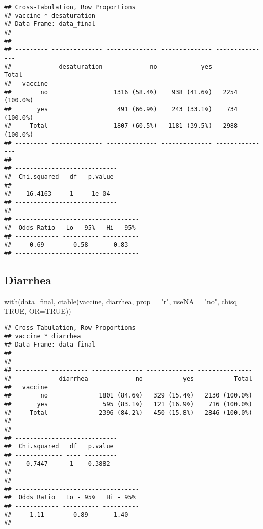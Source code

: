 \documentclass[
]{article}
\newenvironment{Shaded}{\begin{snugshade}}{\end{snugshade}}
\newcommand{\AttributeTok}[1]{\textcolor[rgb]{0.77,0.63,0.00}{#1}}
\newcommand{\ConstantTok}[1]{\textcolor[rgb]{0.00,0.00,0.00}{#1}}
\newcommand{\FunctionTok}[1]{\textcolor[rgb]{0.00,0.00,0.00}{#1}}
\newcommand{\NormalTok}[1]{#1}
\newcommand{\StringTok}[1]{\textcolor[rgb]{0.31,0.60,0.02}{#1}}
\begin{document}
\begin{verbatim}
## Cross-Tabulation, Row Proportions  
## vaccine * desaturation  
## Data Frame: data_final  
## 
## 
## --------- -------------- -------------- -------------- ---------------
##             desaturation             no            yes           Total
##   vaccine                                                             
##        no                  1316 (58.4%)    938 (41.6%)   2254 (100.0%)
##       yes                   491 (66.9%)    243 (33.1%)    734 (100.0%)
##     Total                  1807 (60.5%)   1181 (39.5%)   2988 (100.0%)
## --------- -------------- -------------- -------------- ---------------
## 
## ----------------------------
##  Chi.squared   df   p.value 
## ------------- ---- ---------
##    16.4163     1     1e-04  
## ----------------------------
## 
## ----------------------------------
##  Odds Ratio   Lo - 95%   Hi - 95% 
## ------------ ---------- ----------
##     0.69        0.58       0.83   
## ----------------------------------
\end{verbatim}

\hypertarget{diarrhea}{%
\subsection{Diarrhea}\label{diarrhea}}

\begin{Shaded}
\begin{Highlighting}[]
\FunctionTok{with}\NormalTok{(data\_final, }\FunctionTok{ctable}\NormalTok{(vaccine, diarrhea, }\AttributeTok{prop =} \StringTok{"r"}\NormalTok{, }\AttributeTok{useNA =} \StringTok{"no"}\NormalTok{, }\AttributeTok{chisq =} \ConstantTok{TRUE}\NormalTok{, }\AttributeTok{OR=}\ConstantTok{TRUE}\NormalTok{))}
\end{Highlighting}
\end{Shaded}

\begin{verbatim}
## Cross-Tabulation, Row Proportions  
## vaccine * diarrhea  
## Data Frame: data_final  
## 
## 
## --------- ---------- -------------- ------------- ---------------
##             diarrhea             no           yes           Total
##   vaccine                                                        
##        no              1801 (84.6%)   329 (15.4%)   2130 (100.0%)
##       yes               595 (83.1%)   121 (16.9%)    716 (100.0%)
##     Total              2396 (84.2%)   450 (15.8%)   2846 (100.0%)
## --------- ---------- -------------- ------------- ---------------
## 
## ----------------------------
##  Chi.squared   df   p.value 
## ------------- ---- ---------
##    0.7447      1    0.3882  
## ----------------------------
## 
## ----------------------------------
##  Odds Ratio   Lo - 95%   Hi - 95% 
## ------------ ---------- ----------
##     1.11        0.89       1.40   
## ----------------------------------
\end{verbatim}
\end{document}
